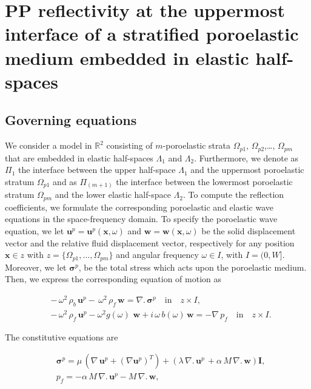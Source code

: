 \documentclass[draft]{agujournal2019}
\begin{document}
\appendix
\section{PP reflectivity at the uppermost interface of a stratified poroelastic medium embedded in elastic half-spaces}

\subsection{Governing equations}
We consider a model in $\mathbb R^2$ consisting of 
$m$-poroelastic strata  $\Omega_{p1}$,  $\Omega_{p2}$,\dots, $\Omega_{pm}$ that are embedded in elastic half-spaces $\Lambda_1$ and $\Lambda_2$. Furthermore, we denote as $\Pi_1$  the interface between the upper half-space $\Lambda_1$ and the uppermost poroelastic stratum $\Omega_{p1}$ and as $\Pi_{(m+1)}$ the interface between the lowermost poroelastic stratum $\Omega_{pm}$ and the lower elastic half-space $\Lambda_2$. To compute the  reflection coefficients, we formulate the corresponding poroelastic and elastic wave equations in the space-frequency domain. To specify the poroelastic wave equation,  we let $\bm{u}^p =\bm{u}^p( \bm{x}, \omega)$ and $\bm{w} =\bm{w}( \bm{x}, \omega)$  be the solid displacement vector and the relative fluid displacement vector, respectively for any position $\bm{x} \in z$ with $z=\{\Omega_{p1},\dots,\Omega_{pm}\}$  and angular frequency $\omega \in I$, with $I =(0,W]$. Moreover, we let $\bm {\sigma}^p$, be the total stress which acts upon the poroelastic medium. Then, we express the corresponding equation of motion as
\begin{linenomath*}
\begin{equation}\label{Eq.a1}
\begin{split}
& -\,\omega^2  \, \rho_b  \, \bm{u}^p -  \,\omega^2 \, \rho_f \, \bm{w}= \nabla . \, \bm{\sigma}^p \quad  \textrm{in} \quad z \times I, \\
& -\,\omega^2  \, \rho_f \, \bm{u}^p - \omega^2 g(\omega) \, \, \bm{w} + i \, \omega \, b(\omega) \, \bm{w} = - \nabla \, p_f \quad  \textrm{in} \quad z \times I.
\end{split}
\end{equation}
\end{linenomath*}
The constitutive equations are
\begin{linenomath*}
\begin{equation}\label{Eq.a2}
\begin{split}
& \bm{\sigma}^p = \mu \,  \left( \nabla \,\bm{u}^p + ({\nabla  \bm{u}^p})^T  \right) +  \left( \lambda \, \nabla . \, \bm{u}^p\, + \alpha \,M \, \nabla . \, \bm{w} \right) \bm{I}, \\
&p_f=- \alpha \, M \, \nabla . \, \bm{u}^p - M \, \nabla . \, \bm{w},  \end{split}
\end{equation}
\end{linenomath*}
\end{document}
